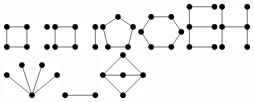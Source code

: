 \documentclass[11pt,paper=b5,footinclude,headinclude]{scrbook} %
\theoremstyle{remark}
\theoremstyle{definition} %
\theoremstyle{theorem} %
\begin{document}
\includegraphics[scale=0.5,frame]{smallGraphs/g_C4U2K1.png}     
\includegraphics[scale=0.5,frame]{smallGraphs/g_C4UP2.png}     
\includegraphics[scale=0.5,frame]{smallGraphs/g_C5.png}     
\includegraphics[scale=0.5,frame]{smallGraphs/g_C6.png}     
\includegraphics[scale=0.5,frame]{smallGraphs/g_E.png}     
\includegraphics[scale=0.5,frame]{smallGraphs/g_H.png}     
\includegraphics[scale=0.5,frame]{smallGraphs/g_K14.png}     
\includegraphics[scale=0.5,frame]{smallGraphs/g_K2.png}     
\includegraphics[scale=0.5,frame]{smallGraphs/g_K23.png}     
\end{document}
